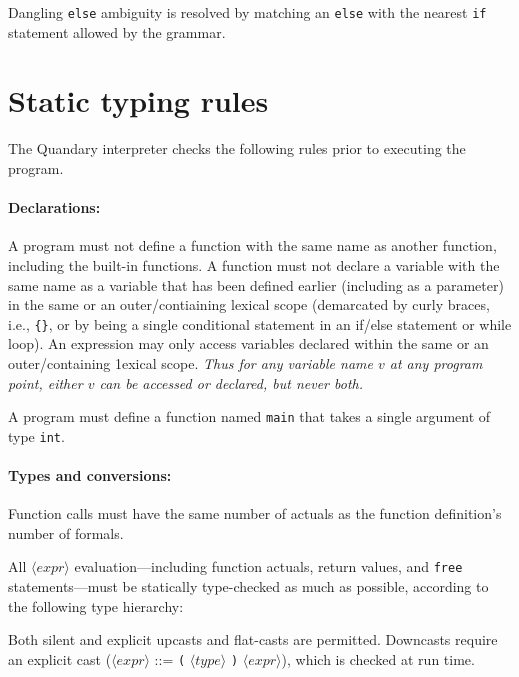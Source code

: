 \documentclass[10pt]{article}
\newcommand{\nt}[1]{\ensuremath{\langle \mathit{#1} \rangle}}
\newcommand{\tm}[1]{\texttt{#1}}
\begin{document}
Dangling \tm{else} ambiguity is resolved by matching an \tm{else} with the nearest \tm{if} statement allowed by the grammar.

\section{Static typing rules}

The Quandary interpreter checks the following rules prior to executing the program.

\paragraph{Declarations:}

A program must not define a function with the same name as another function, including the built-in functions.
A function must not declare a variable with the same name as a variable that has been defined earlier (including as a parameter)
in the same or an outer/contiaining lexical scope (demarcated by curly braces, i.e., \tm{\{\}},
or by being a single conditional statement in an \textsf{if}/\textsf{else} statement or \textsf{while} loop).
An expression may only access variables declared within the same or an outer/containing 1exical scope.
\emph{Thus for any variable name $v$ at any program point, either $v$ can be accessed or declared, but never both.}

A program must define a function named \tm{main} that takes a single argument of type \tm{int}.

\paragraph{Types and conversions:}

Function calls must have the same number of actuals as the function definition's number of formals.

All \nt{expr} evaluation---including function actuals, return values,
and \tm{free} statements---must be statically type-checked as much as possible,
according to the following type hierarchy:

\begin{center}
\end{center}
Both silent and explicit upcasts and flat-casts are permitted.
Downcasts require an explicit cast (\nt{expr} ::= \tm{(} \nt{type} \tm{)} \nt{expr}), which is checked at run time.
\end{document}
